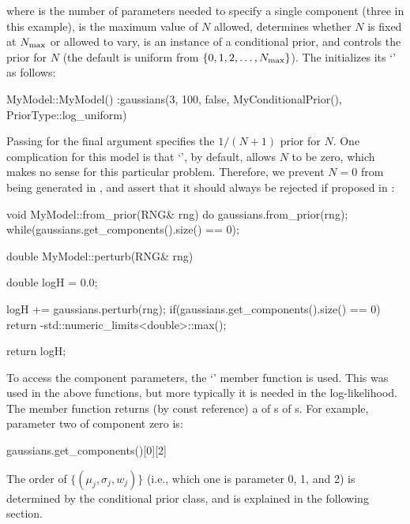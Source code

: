 \documentclass[article]{jss}
\begin{document}
%
where  is the number of parameters needed to
specify a single component (three in this example), 
is the maximum value of $N$ allowed,  determines whether
$N$ is fixed at $N_{\rm max}$ or allowed to vary,
 is an instance of a conditional prior,
and  controls the prior for $N$ (the default is uniform
from $\{0, 1, 2, \ldots, N_{\rm max}\}$). The 
 initializes its `' as follows:
%
\begin{CodeChunk}
\begin{CodeInput}
MyModel::MyModel()
:gaussians(3, 100, false, MyConditionalPrior(), PriorType::log_uniform)
{
}
\end{CodeInput}
\end{CodeChunk}
%
Passing  for the final argument
specifies the $1/(N+1)$ prior for $N$.
One complication for this model is that `', by default,
allows $N$ to be zero, which makes no sense for this particular
problem. Therefore, we prevent $N=0$ from being generated in
, and assert that it should always be
rejected if proposed in :
%
\begin{CodeChunk}
\begin{CodeInput}
void MyModel::from_prior(RNG& rng)
{
    do
    {
        gaussians.from_prior(rng);
    }while(gaussians.get_components().size() == 0);
}

double MyModel::perturb(RNG& rng)
{
    double logH = 0.0;

    logH += gaussians.perturb(rng);
    if(gaussians.get_components().size() == 0)
        return -std::numeric_limits<double>::max();

    return logH;
}
\end{CodeInput}
\end{CodeChunk}
%
To access the component parameters, the `' member function
 is used. This was used in the above functions, but more
typically it is needed in the log-likelihood.
The member function  returns (by const reference) a
 of s of s. For example,
parameter two of component zero is:
%
\begin{CodeChunk}
\begin{CodeInput}
gaussians.get_components()[0][2]
\end{CodeInput}
\end{CodeChunk}
%
The order of $\{(\mu_j, \sigma_j, w_j)\}$
(i.e., which one is parameter 0, 1, and 2)
is determined by the conditional prior class, and is
explained in the following section.
\end{document}
